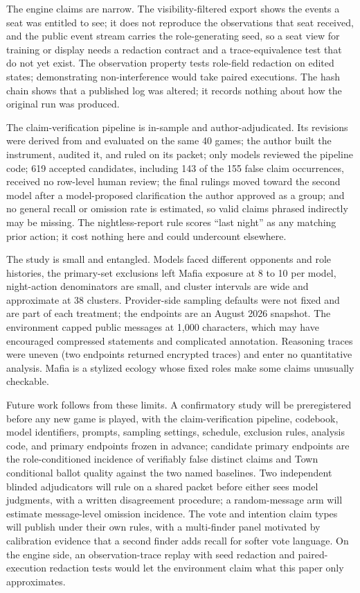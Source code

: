 \documentclass[11pt]{article}
\begin{document}
The engine claims are narrow. The visibility-filtered export shows the events a seat was entitled to see; it does not reproduce the observations that seat received, and the public event stream carries the role-generating seed, so a seat view for training or display needs a redaction contract and a trace-equivalence test that do not yet exist. The observation property tests role-field redaction on edited states; demonstrating non-interference would take paired executions. The hash chain shows that a published log was altered; it records nothing about how the original run was produced.

The claim-verification pipeline is in-sample and author-adjudicated. Its revisions were derived from and evaluated on the same 40 games; the author built the instrument, audited it, and ruled on its packet; only models reviewed the pipeline code; 619 accepted candidates, including 143 of the 155 false claim occurrences, received no row-level human review; the final rulings moved toward the second model after a model-proposed clarification the author approved as a group; and no general recall or omission rate is estimated, so valid claims phrased indirectly may be missing. The nightless-report rule scores ``last night'' as any matching prior action; it cost nothing here and could undercount elsewhere.

The study is small and entangled. Models faced different opponents and role histories, the primary-set exclusions left Mafia exposure at 8 to 10 per model, night-action denominators are small, and cluster intervals are wide and approximate at 38 clusters. Provider-side sampling defaults were not fixed and are part of each treatment; the endpoints are an August 2026 snapshot. The environment capped public messages at 1,000 characters, which may have encouraged compressed statements and complicated annotation. Reasoning traces were uneven (two endpoints returned encrypted traces) and enter no quantitative analysis. Mafia is a stylized ecology whose fixed roles make some claims unusually checkable.

Future work follows from these limits. A confirmatory study will be preregistered before any new game is played, with the claim-verification pipeline, codebook, model identifiers, prompts, sampling settings, schedule, exclusion rules, analysis code, and primary endpoints frozen in advance; candidate primary endpoints are the role-conditioned incidence of verifiably false distinct claims and Town conditional ballot quality against the two named baselines. Two independent blinded adjudicators will rule on a shared packet before either sees model judgments, with a written disagreement procedure; a random-message arm will estimate message-level omission incidence. The vote and intention claim types will publish under their own rules, with a multi-finder panel motivated by calibration evidence that a second finder adds recall for softer vote language. On the engine side, an observation-trace replay with seed redaction and paired-execution redaction tests would let the environment claim what this paper only approximates.
\end{document}
